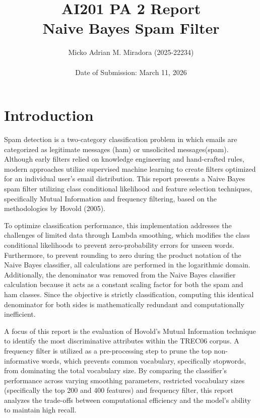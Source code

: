\documentclass{acm_proc_article-sp}
\begin{document}
\title{AI201 PA 2 Report\\ Naive Bayes Spam Filter}

\author{
\alignauthor Micko Adrian M. Miradora (2025-22234)\\ 
~\\
Date of Submission: March 11, 2026
}

\maketitle

\section{Introduction}
Spam detection is a two-category classification problem in which emails are categorized as legitimate messages (ham) or unsolicited messages(spam). Although early filters relied on knowledge engineering and hand-crafted rules, modern approaches utilize supervised machine learning to create filters optimized for an individual user's email distribution. This report presents a Naive Bayes spam filter utilizing class conditional likelihood and feature selection techniques, specifically Mutual Information and frequency filtering, based on the methodologies by Hovold (2005).

To optimize classification performance, this implementation addresses the challenges of limited data through Lambda smoothing, which modifies the class conditional likelihoods to prevent zero-probability errors for unseen words. Furthermore, to prevent rounding to zero during the product notation of the Naive Bayes classifier, all calculations are performed in the logarithmic domain. Additionally, the denominator was removed from the Naive Bayes classifier calculation because it acts as a constant scaling factor for both the spam and ham classes. Since the objective is strictly classification, computing this identical denominator for both sides is mathematically redundant and computationally inefficient.

A focus of this report is the evaluation of Hovold’s Mutual Information technique to identify the most discriminative attributes within the TREC06 corpus. A frequency filter is utilized as a pre-processing step to prune the top non-informative words, which prevents common vocabulary, specifically stopwords, from dominating the total vocabulary size. By comparing the classifier's performance across varying smoothing parameters, restricted vocabulary sizes (specifically the top 200 and 400 features) and frequency filter, this report analyzes the trade-offs between computational efficiency and the model's ability to maintain high recall.
\end{document}
